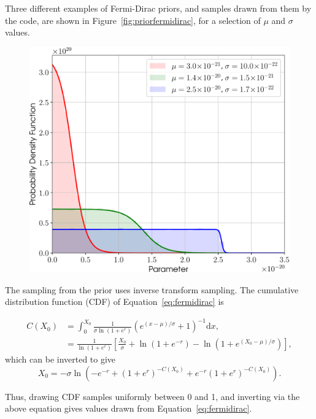 Three different examples of Fermi-Dirac priors, and samples drawn from them by the code, are shown in Figure~\ref{fig:priorfermidirac},
for a selection of $\mu$ and $\sigma$ values.

\begin{figure}[!phtb]
\begin{center}
\includegraphics[width=1\columnwidth]{./figures/priors/fermidirac/fermidirac}
\caption{ \protect}
\end{center}
\end{figure}

The sampling from the prior uses inverse transform sampling. The cumulative distribution function (CDF) of Equation~\ref{eq:fermidirac}
is
\begin{widetext}
\begin{align}
 C(X_0) &= \int_0^{X_0} \frac{1}{\sigma\ln{\left(1+e^{r} \right)}}\left(e^{(x-\mu)/\sigma} + 1\right)^{-1} \text{d}x, \nonumber \\
 &= \frac{1}{\ln{\left(1+e^{r}\right)}}\left[\frac{X_0}{\sigma} + \ln{\left(1+e^{-r} \right)} - \ln{\left( 1+e^{(X_0-\mu)/\sigma}\right)} \right],
\end{align}
which can be inverted to give
\begin{equation}
X_0 = -\sigma \ln{}\left(-e^{-r} + \left(1+e^{r} \right)^{-C(X_0)} + e^{-r}\left(1+e^{r} \right)^{-C(X_0)} \right).
\end{equation}
\end{widetext}
Thus, drawing CDF samples uniformly between 0 and 1, and inverting via the above equation gives values drawn from Equation~\ref{eq:fermidirac}.

